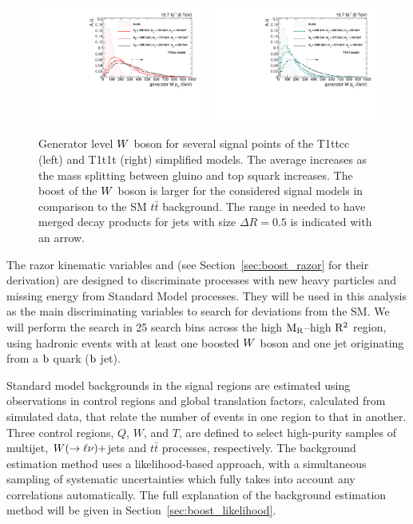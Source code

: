 \begin{figure}[htpb]
\centering
\includegraphics[width=0.48\textwidth]{figures/razor_strategy/T1ttcc_genWpt}
~
\includegraphics[width=0.48\textwidth]{figures/razor_strategy/T1t1t_genWpt}
\caption{Generator level $W$ boson \pt for several signal points of the T1ttcc (left) and T1t1t
(right)
simplified models. The average \pt increases as the mass splitting between gluino and top
squark increases. The boost of the $W$
boson is larger for the considered signal models in comparison to the SM $t\bar{t}$ background. 
The range in \pt needed to have merged decay products for jets with size $\Delta R = 0.5$ is
indicated with an arrow.
\label{fig:boost_gen_Wpt}}
\end{figure}

The razor kinematic variables \mr and \rsq (see Section~\ref{sec:boost_razor} for their
derivation) 
are designed to discriminate processes with new heavy particles and missing energy from Standard
Model processes.
They will be used in this analysis as the main discriminating variables to search for deviations
from the SM. We will perform the search in 25 search bins across the high $\mathrm{M_R}$--high $\mathrm{R^2}$ region,
using hadronic events with at least one boosted $W$ boson and one jet originating from a $\mathrm{b}$
quark (\ie $\mathrm{b}$ jet). 

Standard model backgrounds in the signal regions are estimated using observations in control regions
and global translation factors, calculated from simulated data, that relate the number of events in
one region to that in another. 
Three control regions, $Q$, $W$, and $T$, are defined to select high-purity samples of multijet,
$W(\rightarrow \ell\nu)+$jets and $t\bar{t}$ processes, respectively.  
The background estimation method uses a likelihood-based approach, with a simultaneous sampling
of systematic uncertainties which fully takes into account any correlations automatically.
The full explanation of the background estimation method will be given in
Section~\ref{sec:boost_likelihood}. 



